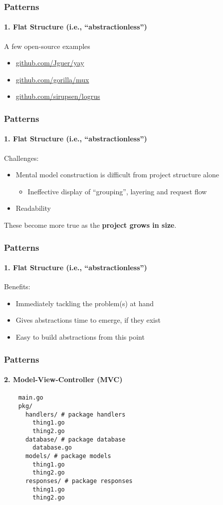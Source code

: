 \begin{frame}[fragile]
  \frametitle{Patterns}
  \framesubtitle{1. Flat Structure (i.e., ``abstractionless'')}

  A few open-source examples
  \begin{itemize}
    \item \url{github.com/Jguer/yay}
    \item \url{github.com/gorilla/mux}
    \item \url{github.com/sirupsen/logrus}
  \end{itemize}

\end{frame}

\begin{frame}[fragile]
  \frametitle{Patterns}
  \framesubtitle{1. Flat Structure (i.e., ``abstractionless'')}

  Challenges:
  \begin{itemize}
    \pause
    \item Mental model construction is difficult from project structure alone
    \begin{itemize}
      \item Ineffective display of ``grouping'', layering and request flow
    \end{itemize}
    \pause
    \item Readability
  \end{itemize}

  \vspace{1em}
  \centering
  \pause
  These become more true as the \textbf{project grows in size}.

\end{frame}

\begin{frame}[fragile]
  \frametitle{Patterns}
  \framesubtitle{1. Flat Structure (i.e., ``abstractionless'')}

  Benefits:
  \begin{itemize}
    \pause
    \item Immediately tackling the problem(s) at hand
    \pause
    \item Gives abstractions time to emerge, if they exist
    \pause
    \item Easy to build abstractions from this point
  \end{itemize}

\end{frame}

\begin{frame}[fragile]
  \frametitle{Patterns}
  \framesubtitle{2. Model-View-Controller (MVC)}

  \begin{verbatim}
    main.go
    pkg/
      handlers/ # package handlers
        thing1.go
        thing2.go
      database/ # package database
        database.go
      models/ # package models
        thing1.go
        thing2.go
      responses/ # package responses
        thing1.go
        thing2.go
  \end{verbatim}
\end{frame}

